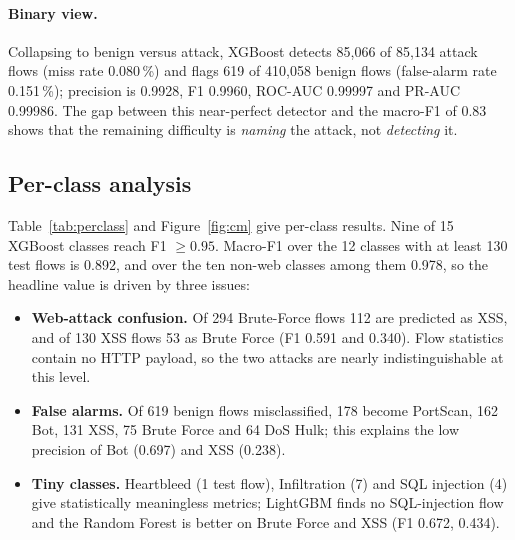 \documentclass[11pt,a4paper]{article}
\begin{document}
\paragraph{Binary view.} Collapsing to benign versus attack, XGBoost detects 85{,}066 of 85{,}134 attack flows (miss rate 0.080\,\%) and flags 619 of 410{,}058 benign flows (false-alarm rate 0.151\,\%); precision is 0.9928, F1 0.9960, ROC-AUC 0.99997 and PR-AUC 0.99986. The gap between this near-perfect detector and the macro-F1 of 0.83 shows that the remaining difficulty is \emph{naming} the attack, not \emph{detecting} it.

\subsection{Per-class analysis}
Table~\ref{tab:perclass} and Figure~\ref{fig:cm} give per-class results. Nine of 15 XGBoost classes reach F1 $\geq0.95$. Macro-F1 over the 12 classes with at least 130 test flows is 0.892, and over the ten non-web classes among them 0.978, so the headline value is driven by three issues:
\begin{itemize}
  \item \textbf{Web-attack confusion.} Of 294 Brute-Force flows 112 are predicted as XSS, and of 130 XSS flows 53 as Brute Force (F1 0.591 and 0.340). Flow statistics contain no HTTP payload, so the two attacks are nearly indistinguishable at this level.
  \item \textbf{False alarms.} Of 619 benign flows misclassified, 178 become PortScan, 162 Bot, 131 XSS, 75 Brute Force and 64 DoS Hulk; this explains the low precision of Bot (0.697) and XSS (0.238).
  \item \textbf{Tiny classes.} Heartbleed (1 test flow), Infiltration (7) and SQL injection (4) give statistically meaningless metrics; LightGBM finds no SQL-injection flow and the Random Forest is better on Brute Force and XSS (F1 0.672, 0.434).
\end{itemize}
\end{document}
